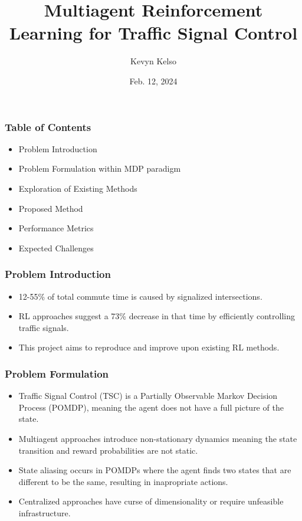 \documentclass[compress,12pt]{beamer}
\title{Multiagent Reinforcement Learning for Traffic Signal Control}
\date{Feb. 12, 2024}
\author{Kevyn Kelso}
\institute{University of Colorado at Colorado Springs}
\begin{document}
\frame[plain]{\titlepage}


\begin{frame}[bg=arguelles.png]
      \frametitle{Table of Contents}
      \begin{itemize}
      \item Problem Introduction
      \item Problem Formulation within MDP paradigm
      \item Exploration of Existing Methods
      \item Proposed Method
      \item Performance Metrics
      \item Expected Challenges
      \end{itemize}
\end{frame}

\begin{frame}[bg=arguelles.png]
      \frametitle{Problem Introduction}
      \begin{itemize}
      \item 12-55\% of total commute time is caused by signalized intersections.
      \item RL approaches suggest a 73\% decrease in that time by efficiently controlling traffic signals.
      \item This project aims to reproduce and improve upon existing RL methods.
      \end{itemize}
\end{frame}



\begin{frame}[bg=arguelles.png]
      \frametitle{Problem Formulation}
      \begin{itemize}
      \item Traffic Signal Control (TSC) is a Partially Observable Markov Decision Process (POMDP), meaning the agent does not have a full picture of the state.
      \item Multiagent approaches introduce non-stationary dynamics meaning the state transition and reward probabilities are not static.
      \item State aliasing occurs in POMDPs where the agent finds two states that are different to be the same, resulting in inapropriate actions. 
      \item Centralized approaches have curse of dimensionality or require unfeasible infrastructure.
      \end{itemize}
\end{frame}
\end{document}
